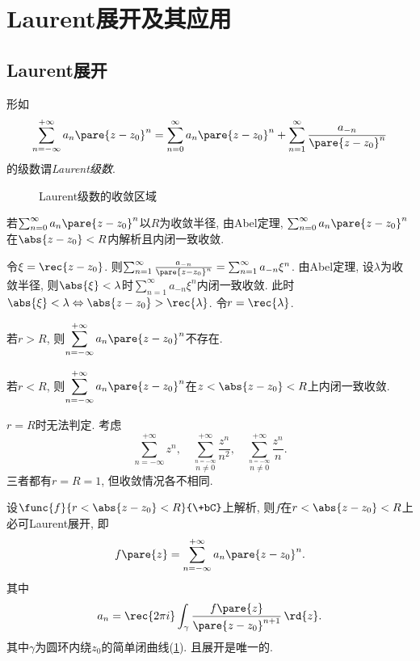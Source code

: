 \documentclass{ctexart}
\begin{document}
\section{Laurent展开及其应用} %
\label{sec:laurent展开及其应用}

\subsection{Laurent展开} %
\label{sub:laurent展开}

形如
\[ \sum_{n=-\infty}^{+\infty} a_n\pare{z-z_0}^n = \sum_{n=0}^\infty a_n\pare{z-z_0}^n + \sum_{n=1}^\infty \frac{a_{-n}}{\pare{z-z_0}^n} \]
的级数谓\emph{Laurent级数}.
\begin{figure}[ht]
    \centering
    \caption{Laurent级数的收敛区域}
    \label{fig:Laurent级数的收敛区域}
\end{figure}
\begin{cenum}
    \item 若$\sum_{n=0}^\infty a_n\pare{z-z_0}^n$以$R$为收敛半径, 由Abel定理, $\sum_{n=0}^\infty a_n\pare{z-z_0}^n$在$\abs{z-z_0}<R$内解析且内闭一致收敛.
    \item 令$\xi = \displaystyle \rec{z-z_0}$. 则$\sum_{n=1}^\infty \frac{a_{-n}}{\pare{z-z_0}^n} = \sum_{n=1}^\infty a_{-n}\xi^n$. 由Abel定理, 设$\lambda$为收敛半径, 则$\abs{\xi}<\lambda$时$\displaystyle \sum_{n=1}^\infty a_{-n}\xi^n$内闭一致收敛. 此时$\abs{\xi}<\lambda\Leftrightarrow \abs{z-z_0} > \displaystyle \rec{\lambda}$. 令$r = \displaystyle\rec{\lambda}$.
    \item 若$r>R$, 则$\displaystyle \sum_{n=-\infty}^{+\infty} a_n\pare{z-z_0}^n$不存在.
    \item 若$r<R$, 则$\displaystyle \sum_{n=-\infty}^{+\infty} a_n\pare{z-z_0}^n$在$z<\abs{z-z_0}<R$上内闭一致收敛.
    \item $r=R$时无法判定. 考虑
    \[ \sum_{n=-\infty}^{+\infty} z^n,\quad \sum_{\stackrel{\scriptstyle n=-\infty}{n\neq 0}}^{+\infty} \frac{z^n}{n^2},\quad \sum_{\stackrel{\scriptstyle n=-\infty}{n\neq 0}}^{+\infty} \frac{z^n}{n}. \]
    三者都有$r=R=1$, 但收敛情况各不相同.
\end{cenum}
\begin{theorem}
    设$\func{f}{r<\abs{z-z_0}<R}{\+bC}$上解析, 则$f$在$r<\abs{z-z_0}<R$上必可Laurent展开, 即
    \[ f\pare{z} = \sum_{n=-\infty}^{+\infty} a_n\pare{z-z_0}^n. \]
    其中
    \[ a_n = \rec{2\pi i}\int_{\gamma} \frac{f\pare{z}}{\pare{z-z_0}^{n+1}}\,\rd{z}. \]
    其中$\gamma$为圆环内绕$z_0$的简单闭曲线(\cref{fig:Laurent级数的收敛区域}). 且展开是唯一的.
\end{theorem}
\end{document}
